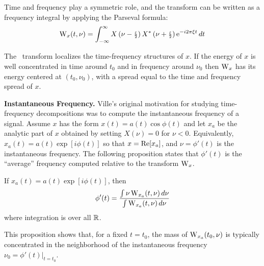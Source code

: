 Time and frequency play a symmetric role, %
and the transform can be written as a frequency integral by
applying the Parseval formula:
\begin{equation} \label{eqn:WignerVilleF}
\W_x(t,\nu) = %
\integral \Xtpush \Xtpullconj \e^{-i2\pi\xi t}\,dt
\end{equation}

The \WV\ transform localizes the time-frequency structures of $x$.  If
the energy of $x$ is well concentrated in time around $t_0$ and in
frequency around $\nu_0$ then $\operatorname{W}_x$ has its energy centered at
$(t_0,\nu_0)$, with a spread equal to the time and frequency spread of
$x$. 

\begin{define} {\bf Instantaneous Frequency. }
Ville's original motivation for studying time-frequency decompositions
was to compute the instantaneous frequency of a signal.  Assume $x$
has the form $x(t) = a(t)\cos\phi(t)$ and let $x_a$ be the analytic
part of $x$ obtained by setting $X(\nu)=0$ for $\nu < 0$.  Equivalently,
$x_a(t) = a(t)\exp[i\phi(t)]$ so that $x = \mbox{Re}[x_a]$, and
$\nu=\phi'(t)$ is the instantaneous frequency.  The following
proposition states that $\phi'(t)$ is the ``average'' frequency
computed relative to the transform $\operatorname{W}_x$.
\end{define}
\begin{prop}
If $x_a(t) =  a(t)\exp[i\phi(t)]$, then
\[
  \phi'(t) =
  \frac{\int \nu \operatorname{W}_{x_a}(t,\nu)\,d\nu}
       {\int \operatorname{W}_{x_a}(t,\nu)\,d\nu}
\]
where integration is over all $\mathbb{R}$.
\end{prop}
This proposition shows that, for a fixed $t=t_0$, the mass of
$\operatorname{W}_{x_a}(t_0,\nu)$ is typically concentrated in the neighborhood of the
instantaneous frequency $\nu_0 = \left.\phi'(t)\right|_{t=t_0}$.

